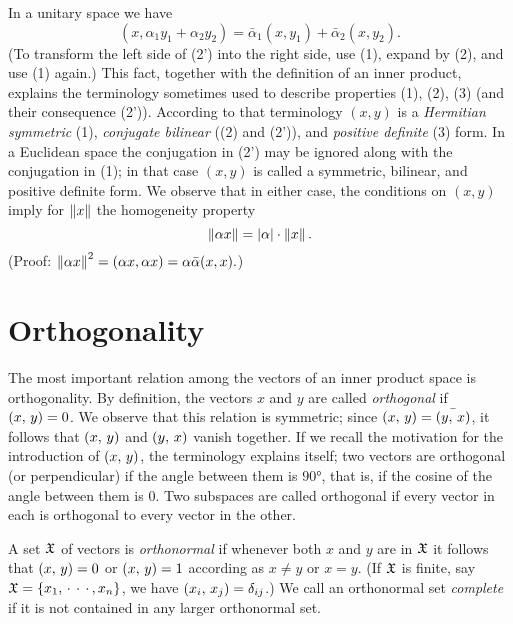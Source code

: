 In a unitary space we have
\begin{equation}\tag{2*}
    (x, \alpha_1 y_1 + \alpha_2 y_2) = \bar{\alpha}_1(x, y_1) + \bar{\alpha}_2(x, y_2).
\end{equation}
(To transform the left side of (2') into the right side, use (1), expand by (2),
and use (1) again.) This fact, together with the definition of an inner product,
explains the terminology sometimes used to describe properties (1), (2), (3)
(and their consequence (2')). According to that terminology \((x, y)\) is a
\emph{Hermitian symmetric} (1), \emph{conjugate bilinear} ((2) and (2')), and
\emph{positive definite} (3) form. In a Euclidean space the conjugation in (2')
may be ignored along with the conjugation in (1); in that case \((x, y)\) is
called a symmetric, bilinear, and positive definite form. We observe that in
either case, the conditions on \((x, y)\) imply for \(\left\lVert x\right\rVert\) the homogeneity
property
\begin{equation*}
    \left\lVert\alpha x\right\rVert = \left\lvert\alpha\right\rvert \cdot \left\lVert x\right\rVert.
\end{equation*}
(Proof: \(\left\lVert\alpha x\right\rVert^ 2 = (\alpha x, \alpha x) = \alpha \bar{\alpha} (x, x).\))

\section{Orthogonality}

The most important relation among the vectors of an inner product space is
orthogonality. By definition, the vectors \(x\) and \(y\) are called
\emph{orthogonal} if \(\left(x,\,y\right) = 0\). We observe that this relation is
symmetric; since \(\left(x,\,y\right) =\bar{\left(y,\,x\right)}\), it follows that
\(\left(x,\,y\right)\) and \(\left(y,\,x\right)\) vanish together. If we recall the
motivation for the introduction of \(\left(x,\,y\right)\), the terminology
explains itself; two vectors are orthogonal (or perpendicular) if the angle
between them is \(90°\), that is, if the cosine of the angle between them is
\(0\). Two subspaces are called orthogonal if every vector in each is orthogonal
to every vector in the other.

A set \(\frak{X}\) of vectors is \emph{orthonormal} if whenever both \(x\) and
\(y\) are in \(\frak{X}\) it follows that \(\left(x,\,y\right) = 0\) or
\(\left(x,\,y\right) = 1\) according as \(x \neq y\) or \(x = y\). (If
\(\frak{X}\) is finite, say \(\frak{X} = \{x_1, \, \cdot\, \cdot\, \cdot\,,
x_n\}\), we have \(\left(x_i,\,x_j\right) = \delta_{ij}\).) We call an orthonormal
set \emph{complete} if it is not contained in any larger orthonormal set.

